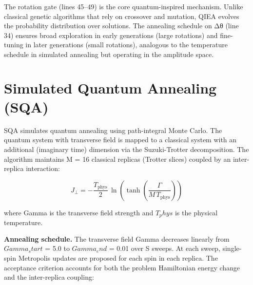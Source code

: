 
The rotation gate (lines 45–49) is the core quantum-inspired mechanism. Unlike classical genetic algorithms that rely on crossover and mutation, QIEA evolves the probability distribution over solutions. The annealing schedule on Δθ (line 34) ensures broad exploration in early generations (large rotations) and fine-tuning in later generations (small rotations), analogous to the temperature schedule in simulated annealing but operating in the amplitude space.

\section{Simulated Quantum Annealing (SQA)}
SQA simulates quantum annealing using path-integral Monte Carlo. The quantum system with transverse field is mapped to a classical system with an additional (imaginary time) dimension via the Suzuki-Trotter decomposition. The algorithm maintains M = 16 classical replicas (Trotter slices) coupled by an inter-replica interaction:

\begin{equation}
J_{\perp} = -\frac{T_{\text{phys}}}{2} \, \ln\!\left( \tanh\!\left( \frac{\Gamma}{M \, T_{\text{phys}}} \right) \right)
\end{equation}

where Gamma is the transverse field strength and $T_phys$ is the physical temperature.

\textbf{Annealing schedule.} The transverse field Gamma decreases linearly from $Gamma_start$ = 5.0 to $Gamma_end$ = 0.01 over S sweeps. At each sweep, single-spin Metropolis updates are proposed for each spin in each replica. The acceptance criterion accounts for both the problem Hamiltonian energy change and the inter-replica coupling:

